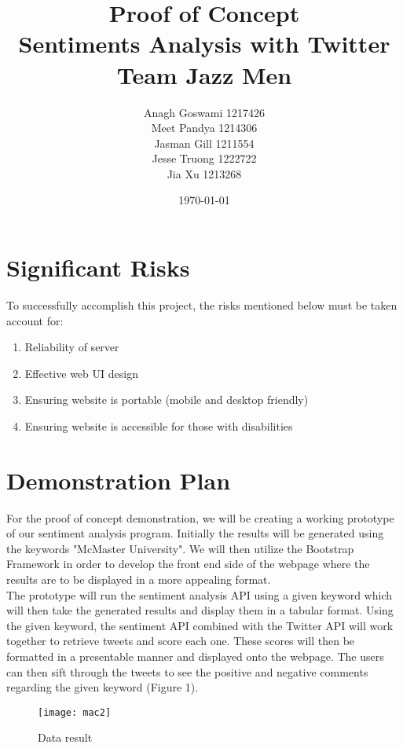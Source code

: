 \documentclass[12pt]{article}
\begin{document}
\title{Proof of Concept\\ Sentiments Analysis with Twitter \\Team Jazz Men}
\author{Anagh Goswami 1217426 \\ Meet Pandya 1214306 \\ Jasman Gill  1211554 \\ Jesse Truong  1222722 \\ Jia Xu  1213268 \\}
\date{\today}
\maketitle
\newpage

\section{Significant Risks}
To successfully accomplish this project, the risks mentioned below must be taken account for:
\begin{enumerate}
	\item Reliability of server
	\item Effective web UI design
	\item Ensuring website is portable (mobile and desktop friendly)
	\item Ensuring website is accessible for those with disabilities
	
\end{enumerate}



\section{Demonstration Plan}
For the proof of concept demonstration, we will be creating a working prototype of our sentiment analysis program. Initially the results will be generated using the keywords "McMaster University". We will then utilize the Bootstrap Framework in order to develop the front end side of the webpage where the results are to be displayed in a more appealing format. \\

The prototype will run the sentiment analysis API using a given keyword which will then take the generated results and display them in a tabular format. Using the given keyword, the sentiment API combined with the Twitter API will work together to retrieve tweets and score each one. These scores will then be formatted in a presentable manner and displayed onto the webpage. The users can then sift through the tweets to see the positive and negative comments regarding the given keyword (Figure 1). 

\begin{figure}[!htb]
\centering
\texttt{[image: mac2]}
\caption{Data result}
\label{fig:Data}
\end{figure}
\end{document}

